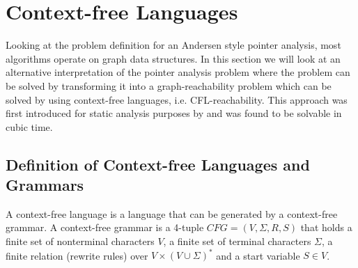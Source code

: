 \section{Context-free Languages}
Looking at the problem definition for an Andersen style pointer analysis, most algorithms operate on graph data structures.
In this section we will look at an alternative interpretation of the pointer analysis problem where the problem can be solved by transforming it into a graph-reachability problem which can be solved by using context-free languages, i.e. CFL-reachability.
This approach was first introduced for static analysis purposes by \cite{reps1998program} and was found to be solvable in cubic time.

\subsection{Definition of Context-free Languages and Grammars}
A context-free language is a language that can be generated by a context-free grammar.
A context-free grammar is a 4-tuple $CFG=(V,\Sigma,R,S)$ that holds a finite set of nonterminal characters $V$, a finite set of terminal characters $\Sigma$, a finite relation (rewrite rules) over $V\times (V \cup \Sigma)^*$ and a start variable $S \in V$.

